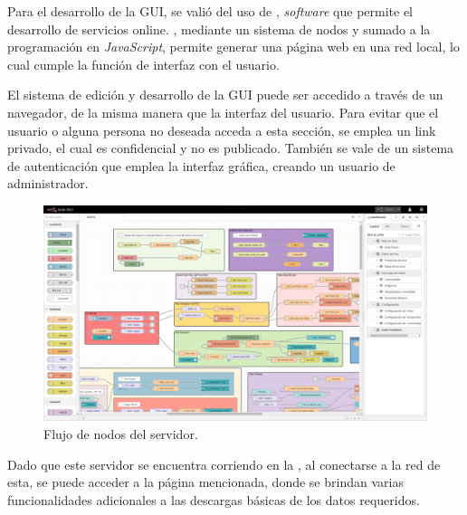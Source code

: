 Para el desarrollo de la GUI, se valió del uso de \nodered, \textit{software} que permite el desarrollo de servicios online. \nodered, mediante un sistema de nodos y sumado a la programación en \textit{JavaScript}, permite generar una página web en una red local, lo cual cumple la función de interfaz con el usuario.

El sistema de edición y desarrollo de la GUI puede ser accedido a través de un navegador, de la misma manera que la interfaz del usuario. Para evitar que el usuario o alguna persona no deseada acceda a esta sección, se emplea un link privado, el cual es confidencial y no es publicado. También se vale de un sistema de autenticación que emplea la interfaz gráfica, creando un usuario de administrador.
\begin{figure}[H]
	\centering
	\includegraphics[width=0.9\linewidth]{ImagenesIngenieria de Detalle/Node-Red-Flow}
	\caption{Flujo de nodos del servidor.}
	\label{fig:node_red_flow}
\end{figure}

Dado que este servidor se encuentra corriendo en la \rpi, al conectarse a la red de esta, se puede acceder a la página mencionada, donde se brindan varias funcionalidades adicionales a las descargas básicas de los datos requeridos.

